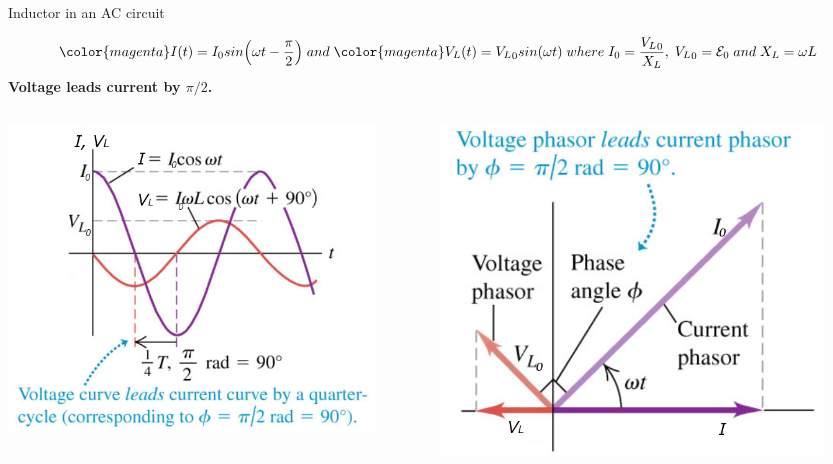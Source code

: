 %
%
%

\begin{frame}{Inductor in an AC circuit}

\begin{center}
{\scriptsize
\begin{equation*}
   {\color{magenta}  I(t) = I_0 sin \Big(\omega t - \frac{\pi}{2} \Big) } \; and \;
   {\color{magenta}  V_L(t) = {V_L}_0 sin(\omega t)} \;
   where \; I_0 = \frac{{V_L}_0}{X_L}, \; {V_L}_0 = \mathcal{E}_0 \; and \; X_L = \omega L
\end{equation*}
}
{\color{magenta}
  {\bf Voltage leads current by $\pi/2$.}
}
\end{center}

\begin{columns}
  \begin{column}{0.50\textwidth}
    \begin{center}
       \includegraphics[width=0.90\textwidth]{./images/schematics/ac_inductor_graph.png}\\
     \end{center}
  \end{column}
  \begin{column}{0.50\textwidth}
    \begin{center}
       \includegraphics[width=0.90\textwidth]{./images/schematics/ac_inductor_phasor.png}\\

\end{center}
\end{column}
\end{columns}
\end{frame}
